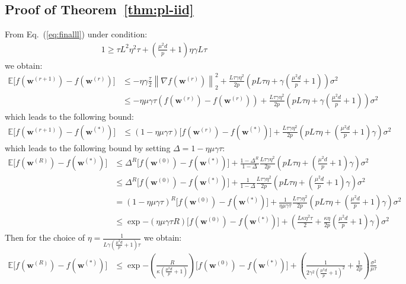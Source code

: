 \subsection{Proof of Theorem~\ref{thm:pl-iid}}
From Eq.~(\ref{eq:finalll}) under condition:
\begin{align}
       1\geq {\tau L^2\eta^2\tau}+{(\frac{\mu^2d}{p}+1)\eta\gamma L}{\tau} 
\end{align}
we obtain:
\begin{align}
         \mathbb{E}\Big[f({\boldsymbol{w}}^{(r+1)})-f({\boldsymbol{w}}^{(r)})\Big]&\leq -\eta\gamma\frac{\tau}{2}\left\|\nabla f({\boldsymbol{w}}^{(r)})\right\|_2^2+\frac{L\tau\gamma\eta^2 }{2p}\left(pL\tau\eta+\gamma(\frac{\mu^2d}{p}+1)\right)\sigma^2\nonumber\\
         &\leq -\eta\mu\gamma{\tau} \left(f({\boldsymbol{w}}^{(r)})-f({\boldsymbol{w}}^{(r)})\right)+\frac{L\tau\gamma\eta^2 }{2p}\left(pL\tau\eta+\gamma(\frac{\mu^2d}{p}+1)\right)\sigma^2 
\end{align}
which leads to the following bound:
\begin{align}
            \mathbb{E}\Big[f({\boldsymbol{w}}^{(r+1)})-f({\boldsymbol{w}}^{(*)})\Big]&\leq \left(1-\eta\mu\gamma{\tau}\right) \Big[f({\boldsymbol{w}}^{(r)})-f({\boldsymbol{w}}^{(*)})\Big]+\frac{L\tau\gamma\eta^2 }{2p}\left(pL\tau\eta+(\frac{\mu^2d}{p}+1)\gamma\right)\sigma^2
\end{align}
which leads to the following bound by setting $\Delta=1-\eta\mu\gamma{\tau}$:
\begin{align}
            \mathbb{E}\Big[f({\boldsymbol{w}}^{(R)})-f({\boldsymbol{w}}^{(*)})\Big]&\leq \Delta^R \Big[f({\boldsymbol{w}}^{(0)})-f({\boldsymbol{w}}^{(*)})\Big]+\frac{1-\Delta^R}{1-\Delta}\frac{L\tau\gamma\eta^2 }{2p}\left(pL\tau\eta+(\frac{\mu^2d}{p}+1)\gamma\right)\sigma^2\nonumber\\
            &\leq \Delta^R \Big[f({\boldsymbol{w}}^{(0)})-f({\boldsymbol{w}}^{(*)})\Big]+\frac{1}{1-\Delta}\frac{L\tau\gamma\eta^2 }{2p}\left(pL\tau\eta+(\frac{\mu^2d}{p}+1)\gamma\right)\sigma^2\nonumber\\
            &={\left(1-\eta\mu\gamma{\tau}\right)}^R \Big[f({\boldsymbol{w}}^{(0)})-f({\boldsymbol{w}}^{(*)})\Big]+\frac{1}{\eta\mu\gamma{\tau}}\frac{L\tau\gamma\eta^2 }{2p}\left(pL\tau\eta+(\frac{\mu^2d}{p}+1)\gamma\right)\sigma^2\nonumber\\
            &\leq \exp{-\left(\eta\mu\gamma{\tau} R\right)}\Big[f({\boldsymbol{w}}^{(0)})-f({\boldsymbol{w}}^{(*)})\Big]+\left(\frac{L\kappa\eta^2 \tau}{2}+\frac{\kappa\eta }{2p}(\frac{\mu^2d}{p}+1)\gamma\right)\sigma^2
\end{align}
Then for the choice of $\eta=\frac{1}{L\gamma (\frac{\mu^2d}{p}+1) \tau}$ we obtain:
\begin{align}
                \mathbb{E}\Big[f({\boldsymbol{w}}^{(R)})-f({\boldsymbol{w}}^{(*)})\Big]&\leq \exp{-\left(\frac{ R}{\kappa (\frac{\mu^2d}{p}+1)}\right)}\Big[f({\boldsymbol{w}}^{(0)})-f({\boldsymbol{w}}^{(*)})\Big]+\left(\frac{1}{2\gamma^2 {(\frac{\mu^2d}{p}+1)}^2 }+\frac{1}{2p}\right)\frac{\sigma^2}{\mu\tau}
\end{align}

